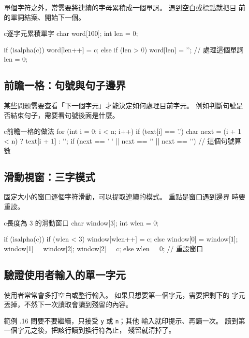 單個字符之外，常需要將連續的字母累積成一個單詞。 遇到空白或標點就把目
前的單詞結案、開始下一個。

\begin{code}{c}{逐字元累積單字}
char word[100];
int len = 0;

if (isalpha(c)) {
    word[len++] = c;
} else if (len > 0) {
    word[len] = '\0';
    // 處理這個單詞
    len = 0;
}
\end{code}

\subsection{前瞻一格：句號與句子邊界}

某些問題需要查看「下一個字元」才能決定如何處理目前字元。 例如判斷句號是
否結束句子，需要看句號後面是什麼。

\begin{code}{c}{前瞻一格的做法}
for (int i = 0; i < n; i++) {
    if (text[i] == '.') {
        char next = (i + 1 < n) ? text[i + 1] : '\0';
        if (next == ' ' || next == '\n' || next == '\0') {
            // 這個句號算數
        }
    }
}
\end{code}

\subsection{滑動視窗：三字模式}

固定大小的窗口逐個字符滑動，可以提取連續的模式。 重點是窗口遇到邊界
時要重設。

\begin{code}{c}{長度為 3 的滑動窗口}
char window[3];
int wlen = 0;

if (isalpha(c)) {
    if (wlen < 3) {
        window[wlen++] = c;
    } else {
        window[0] = window[1];
        window[1] = window[2];
        window[2] = c;
    }
} else {
    wlen = 0;  // 重設窗口
}
\end{code}

\subsection{驗證使用者輸入的單一字元}

使用者常常會多打空白或整行輸入。 如果只想要第一個字元，需要把剩下的
字元丟掉，不然下一次讀取會讀到殘留的內容。

範例 \thechapter.16 問要不要繼續，只接受 \texttt{y} 或 \texttt{n}；其他
輸入就印提示、再讀一次。 讀到第一個字元之後，把該行讀到換行符為止，
殘留就清掉了。

